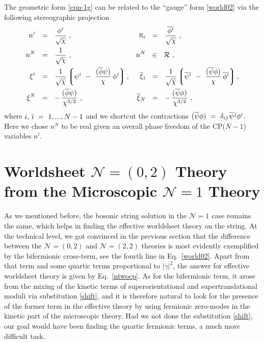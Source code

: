 \documentclass[12pt]{article}
\newcommand{\ntwot}{${\mathcal N}= \left(2,2\right) $ }
\newcommand{\ntwoo}{${\mathcal N}= \left(0,2\right) $ }
\newcommand{\none}{${\mathcal N}=1$ }
\newcommand{\ov}{\overline}
\newcommand{\mc}[1]{\mathcal{#1}}
\newcommand{\lgr}{\left\lgroup}
\newcommand{\rgr}{\right\rgroup}
\begin{document}
	The geometric form \eqref{cpn-1g} can be related to the ``gauge'' form \eqref{world02}
	via the following stereographic projection
\begin{align*}
%
	n^i & ~~=~~ \frac{\phi^i}{\sqrt{\chi}}~,
	& 
	\ov{n}_\bi & ~~=~~ \frac{\ov{\phi}{}^\bi}{\sqrt{\chi}}~,
\\
%
	n^N & ~~=~~ \frac{1}{\sqrt{\chi}}~,
	& n^N & ~~\in~~ \mc{R}~,
\\
%
	\xi^i & ~~=~~ \frac{1}{\sqrt{\chi}} \lgr \psi^i ~-~ \frac{(\ov{\phi}\psi)}{\chi}\,\phi^i \rgr,
	& 
	\ov{\xi}{}_\bi & ~~=~~ \frac{1}{\sqrt{\chi}} 
					\lgr \ov{\psi}{}^\bi ~-~ \frac{(\ov{\psi}\phi)}{\chi}\, \ov{\phi}{}^\bi \rgr,
\\
%
	\xi^N & ~~=~~ -\, \frac{(\ov{\phi} \psi)}{\chi^{3/2}}~,
	&
	\ov{\xi}{}_N & ~~=~~ -\, \frac{(\ov{\psi} \phi)}{\chi^{3/2}}~,
\end{align*}
	where $	i,\, {\bar \imath} ~=~ 1, ..., N-1 $ and we shortcut the contractions 
	$ (\ov{\psi} \phi) ~=~ \delta_{i\bj}\, \ov{\psi}{}^\bj \phi^i $.
	Here we chose $ n^N $ to be real given an overall phase freedom of the CP($N-1$) variables $ n^l $.


%
%
\section{Worldsheet \boldmath\ntwoo Theory from the Microscopic \boldmath\none Theory}
\setcounter{equation}{0}

	As we mentioned before, the bosonic string solution in the \none case remains the same,
	which helps in finding the effective worldsheet theory on the string. 
	At the technical level, we got convinced in the previous section that the difference
	between the \ntwoo and \ntwot theories is most evidently exemplified by the bifermionic cross-term,
	see the fourth line in Eq.~\eqref{world02}.
	Apart from that term and some quartic terms proportional to $|\gamma|^2$, the answer for effective worldsheet 
	theory is given by Eq.~\eqref{ntwocp}.
	As for the bifermionic term, it arose from the mixing of the kinetic terms of 
	superorientational and supertranslational moduli via substitution \eqref{shift}, and it is therefore 
	natural to look for the presence of the former term in the effective theory by using fermionic zero-modes 
	in the kinetic part of the microscopic theory. 
	Had we not done the substitution \eqref{shift}, our goal would have been finding the quartic fermionic terms,
	a much more difficult task. 
\end{document}
